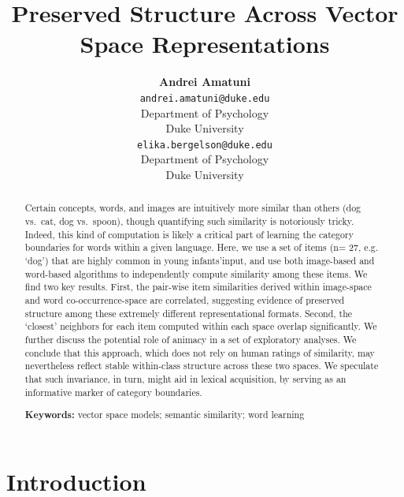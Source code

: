 \documentclass[10pt, letterpaper]{article}
\title{Preserved Structure Across Vector Space Representations}
\author{{\large \bf Andrei Amatuni} \\ \texttt{andrei.amatuni@duke.edu} \\ Department of Psychology \\ Duke University \And {\large \bf Elika Bergelson} \\ \texttt{elika.bergelson@duke.edu} \\ Department of Psychology \\ Duke University}
\begin{document}
\maketitle

\begin{abstract}
Certain concepts, words, and images are intuitively more similar than
others (dog vs.~cat, dog vs.~spoon), though quantifying such similarity
is notoriously tricky. Indeed, this kind of computation is likely a
critical part of learning the category boundaries for words within a
given language. Here, we use a set of items (n= 27, e.g. `dog') that are
highly common in young infants'input, and use both image-based and
word-based algorithms to independently compute similarity among these
items. We find two key results. First, the pair-wise item similarities
derived within image-space and word co-occurrence-space are correlated,
suggesting evidence of preserved structure among these extremely
different representational formats. Second, the `closest' neighbors for
each item computed within each space overlap significantly. We further
discuss the potential role of animacy in a set of exploratory analyses.
We conclude that this approach, which does not rely on human ratings of
similarity, may nevertheless reflect stable within-class structure
across these two spaces. We speculate that such invariance, in turn,
might aid in lexical acquisition, by serving as an informative marker of
category boundaries.

\textbf{Keywords:}
vector space models; semantic similarity; word learning
\end{abstract}

\section{Introduction}\label{introduction}
\end{document}
